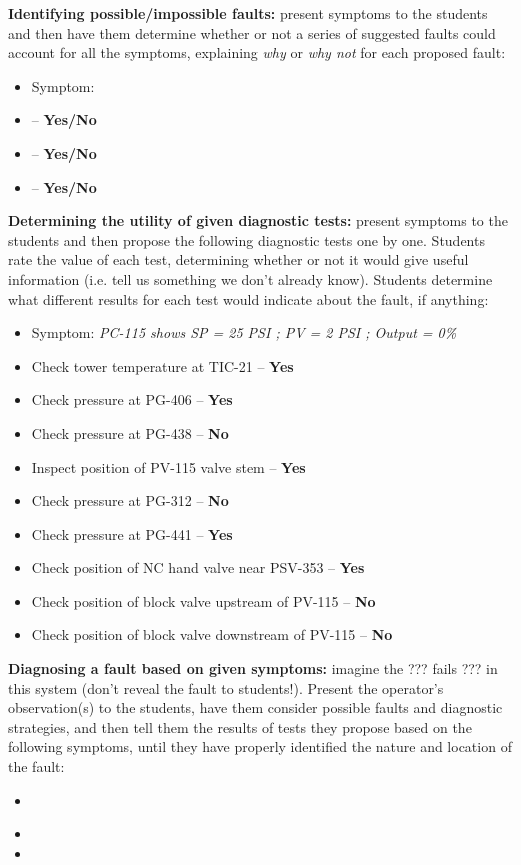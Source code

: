 \vskip 10pt


\noindent
{\bf Identifying possible/impossible faults:} present symptoms to the students and then have them determine whether or not a series of suggested faults could account for all the symptoms, explaining {\it why} or {\it why not} for each proposed fault:

\begin{itemize}
\item{} Symptom: {\it }
\item{}  -- {\bf Yes/No}
\item{}  -- {\bf Yes/No}
\item{}  -- {\bf Yes/No}
\end{itemize}


\vskip 10pt


\noindent
{\bf Determining the utility of given diagnostic tests:} present symptoms to the students and then propose the following diagnostic tests one by one.  Students rate the value of each test, determining whether or not it would give useful information (i.e. tell us something we don't already know).  Students determine what different results for each test would indicate about the fault, if anything:

\begin{itemize}
\item{} Symptom: {\it PC-115 shows SP = 25 PSI ; PV = 2 PSI ; Output = 0\% }
\item{} Check tower temperature at TIC-21 -- {\bf Yes}
\item{} Check pressure at PG-406 -- {\bf Yes}
\item{} Check pressure at PG-438 -- {\bf No}
\item{} Inspect position of PV-115 valve stem -- {\bf Yes}
\item{} Check pressure at PG-312 -- {\bf No}
\item{} Check pressure at PG-441 -- {\bf Yes}
\item{} Check position of NC hand valve near PSV-353 -- {\bf Yes}
\item{} Check position of block valve upstream of PV-115 -- {\bf No}
\item{} Check position of block valve downstream of PV-115 -- {\bf No}
\end{itemize}


\vskip 10pt


\noindent
{\bf Diagnosing a fault based on given symptoms:} imagine the ??? fails ??? in this system (don't reveal the fault to students!).  Present the operator's observation(s) to the students, have them consider possible faults and diagnostic strategies, and then tell them the results of tests they propose based on the following symptoms, until they have properly identified the nature and location of the fault:

\begin{itemize}
\item{} {\it }
\item{} 
\item{} 
\end{itemize}



